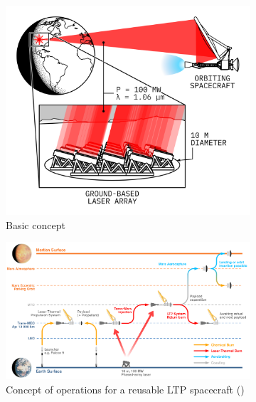     \begin{figure}[h]
        \centering
        \begin{subfigure}[t]{\textwidth}
            \centering
            \includegraphics[]{assets/2 background/ltp_architecture.png}
            \caption{Basic concept}
            \label{fig:ltp_architecture_basic}
        \end{subfigure}
        \begin{subfigure}[t]{\textwidth}
            \centering
            \includegraphics[width=\textwidth]{assets/1 intro/conops.pdf}
            \caption{Concept of operations for a reusable LTP spacecraft (\textcite{duplayDesignRapidTransit2022})}
            \label{fig:ltp_architecture_conops}
        \end{subfigure}
        \caption{}
        \label{fig:ltp_architecture}
    \end{figure}